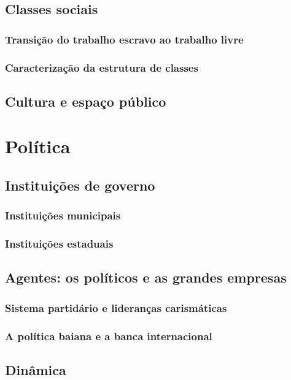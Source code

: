 \documentclass[
	12pt,					%
	openright,			%
	twoside,			%
	a4paper,			%
	english,				%
	french,				%
	spanish,			%
	brazil				%
	]{abntex2}
\begin{document}
\subsection{Classes sociais}\label{subsec:1.1.2}
\lipsum[50]
\subsubsection{Transição do trabalho escravo ao trabalho livre}\label{subsubsec:1.1.2.1}
\lipsum[50]
\subsubsection{Caracterização da estrutura de classes}\label{subsubsec:1.1.2.2}
\lipsum[50]
\subsection{Cultura e espaço público}\label{subsec:1.1.3}
\lipsum[50]
\section{Política}\label{sec:1.2}
\lipsum[50]
\subsection{Instituições de governo}
\lipsum[50]
\subsubsection{Instituições municipais}
\lipsum[50]
\subsubsection{Instituições estaduais}
\lipsum[50]
\subsection{Agentes: os políticos e as grandes empresas}
\lipsum[50]
\subsubsection{Sistema partidário e lideranças carismáticas}
\lipsum[50]
\subsubsection{A política baiana e a banca internacional}
\lipsum[50]
\subsection{Dinâmica}
\lipsum[50]
\end{document}
